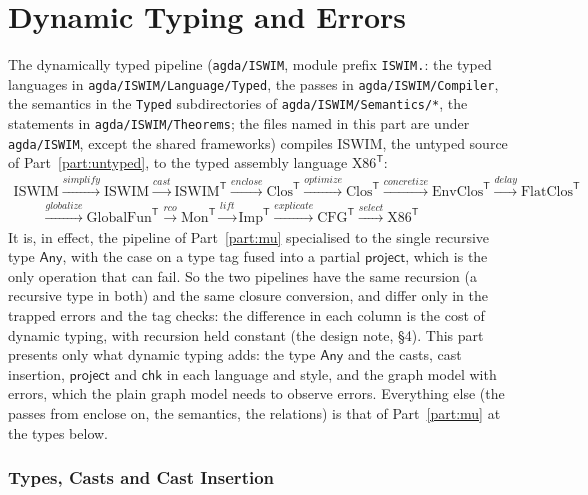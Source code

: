 \documentclass[10pt]{article}
\theoremstyle{acmplain}
\newcommand{\key}[1]{\mathsf{#1}}
\newcommand{\pass}[1]{\mathit{#1}}
\newcommand{\Tl}[1]{\textrm{#1}^{\mathsf{T}}}  %
\newcommand{\TAny}{\key{Any}}
\begin{document}
\part{Dynamic Typing and Errors}\label{part:dyn}

The dynamically typed pipeline (\texttt{agda/ISWIM}, module prefix
\texttt{ISWIM.}: the typed languages in
\texttt{agda/ISWIM/Language/Typed}, the passes in \texttt{agda/ISWIM/Compiler}, the
semantics in the \texttt{Typed} subdirectories of
\texttt{agda/ISWIM/Semantics/*}, the statements in \texttt{agda/ISWIM/Theorems};
the files named in this part are under \texttt{agda/ISWIM}, except the
shared frameworks) compiles
ISWIM, the untyped source of Part~\ref{part:untyped}, to the typed assembly
language $\Tl{X86}$:
\[
\begin{array}{l}
\mathrm{ISWIM} \xrightarrow{\pass{simplify}} \mathrm{ISWIM} \xrightarrow{\pass{cast}} \Tl{ISWIM}
  \xrightarrow{\pass{enclose}} \Tl{Clos} \xrightarrow{\pass{optimize}} \Tl{Clos}
  \xrightarrow{\pass{concretize}} \Tl{EnvClos} \xrightarrow{\pass{delay}} \Tl{FlatClos} \\
\qquad \xrightarrow{\pass{globalize}} \Tl{GlobalFun} \xrightarrow{\pass{rco}} \Tl{Mon}
  \xrightarrow{\pass{lift}} \Tl{Imp} \xrightarrow{\pass{explicate}} \Tl{CFG}
  \xrightarrow{\pass{select}} \Tl{X86}
\end{array}
\]
It is, in effect, the pipeline of Part~\ref{part:mu} specialised to the
single recursive type $\TAny$, with the case on a type tag fused into a
partial $\key{project}$, which is the only operation that can fail. So the
two pipelines have the same recursion (a recursive type in both) and the
same closure conversion, and differ only in the trapped errors and the tag
checks: the difference in each column is the cost of dynamic typing, with
recursion held constant (the design note, \S4). This part presents only
what dynamic typing adds: the type $\TAny$ and the casts, cast insertion,
$\key{project}$ and $\key{chk}$ in each language and style, and the graph
model with errors, which the plain graph model needs to observe errors.
Everything else (the passes from enclose on, the semantics, the
relations) is that of Part~\ref{part:mu} at the types below.

\section{Types, Casts and Cast Insertion}\label{sec:t-langs}
\end{document}
